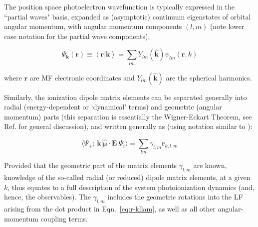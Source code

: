 \documentclass[10pt]{article}
\begin{document}
The position space photoelectron wavefunction is typically expressed in the ``partial waves" basis, expanded as (asymptotic) continuum eigenstates of orbital angular momentum, with angular momentum components $(l,m)$ (note lower case notation for the partial wave components),  


\begin{equation}
\Psi_\mathbf{k}(\mathbf{r})\equiv\left<\mathbf{r}|\mathbf{k}\right> = \sum_{lm}Y_{lm}(\mathbf{\hat{k}})\psi_{lm}(\mathbf{r},k)
\label{eq:elwf}
\end{equation}

where $\mathbf{r}$ are MF electronic coordinates and $Y_{lm}(\mathbf{\hat{k}})$ are the spherical harmonics.

Similarly, the ionization dipole matrix elements can be separated generally into radial (energy-dependent or `dynamical' terms) and geometric (angular momentum) parts (this separation is essentially the Wigner-Eckart Theorem, see Ref. \cite{zareAngMom} for general discussion), and written generally as (using notation similar to \cite{Reid1991}): 

\begin{equation}
\langle\Psi_{+};\,\mathbf{k}|\hat{\mathbf{\mu}}\cdot\boldsymbol{\mathbf{E}}|\Psi_{i}\rangle = \sum_{lm}\gamma_{l,m}\mathbf{r}_{k,l,m}
\label{eq:r-kllam}
\end{equation}


Provided that the geometric part of the matrix elements $\gamma_{l,m}$ are known, knowledge of the so-called radial (or reduced) dipole matrix elements, at a given 
$k$, %
thus equates to a full description of the system photoionization dynamics (and, hence, the observables). The $\gamma_{l,m}$ includes the geometric rotations  into the LF arising from the dot product in Eqn.~\ref{eq:r-kllam}, as well as all other angular-momentum coupling terms.

\end{document}
